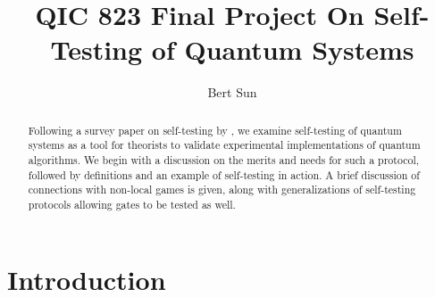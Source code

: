 \documentclass[runningheads,a4paper,english]{llncs}[2022/01/12]
\newcommand{\sidecomment}[1]{\pdfcomment[color={0.045 0.278 0.643},voffset=4pt,icon=Note]{#1}}
\newcommand{\todo}[1]{TODO!\sidecomment{#1}}
\begin{document}
\title{QIC 823 Final Project On Self-Testing of Quantum Systems}

\author{Bert Sun}



%
%

\maketitle

\begin{abstract}
Following a survey paper on self-testing by \cite{selftest}, we examine self-testing of quantum systems as a tool for theorists to validate experimental implementations of quantum algorithms.
We begin with a discussion on the merits and needs for such a protocol, followed by definitions and an example of self-testing in action.
A brief discussion of connections with non-local games is given, along with generalizations of self-testing protocols allowing gates to be tested as well.


\end{abstract}


\section{Introduction}
\label{sec:introduction}


\end{document}
